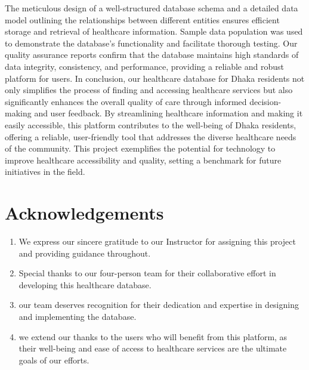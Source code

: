 \documentclass[11pt]{article}
\begin{document}
The meticulous design of a well-structured database schema and a detailed data model outlining the relationships between different entities ensures efficient storage and retrieval of healthcare information. Sample data population was used to demonstrate the database's functionality and facilitate thorough testing. Our quality assurance reports confirm that the database maintains high standards of data integrity, consistency, and performance, providing a reliable and robust platform for users.
In conclusion, our healthcare database for Dhaka residents not only simplifies the process of finding and accessing healthcare services but also significantly enhances the overall quality of care through informed decision-making and user feedback. By streamlining healthcare information and making it easily accessible, this platform contributes to the well-being of Dhaka residents, offering a reliable, user-friendly tool that addresses the diverse healthcare needs of the community. This project exemplifies the potential for technology to improve healthcare accessibility and quality, setting a benchmark for future initiatives in the field.

\section{Acknowledgements}
\begin{enumerate}
    \item We express our sincere gratitude to our Instructor for assigning this project and providing guidance throughout.
    \item Special thanks to our four-person team for their collaborative effort in developing this healthcare database.
    \item our team deserves recognition for their dedication and expertise in designing and implementing the database.
    \item we extend our thanks to the users who will benefit from this platform, as their well-being and ease of access to healthcare services are the ultimate goals of our efforts.
\end{enumerate} 



\newpage
\printbibliography
\end{document}
